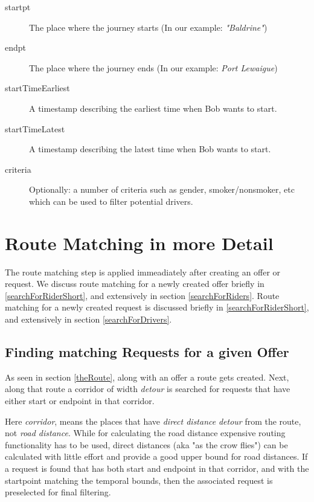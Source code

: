 \begin{description}


\item[startpt]{The place where the journey starts (In our example: \emph{"Baldrine"})}
\item[endpt]{The place where the journey ends (In our example: \emph{Port Lewaigue})}

\item[startTimeEarliest]{A timestamp describing the earliest time when Bob wants to start.}
\item[startTimeLatest]{A timestamp describing the latest time when Bob wants to start.}
\item[criteria]{Optionally: a number of criteria such as gender, smoker/nonsmoker, etc 
      which can be used to filter potential drivers.  	
     }
\end{description}

\section{Route Matching in more Detail}
The route matching step is applied immeadiately after creating an offer or request.
We discuss route matching for a newly created offer briefly in  \ref{searchForRiderShort},
and extensively in section \ref{searchForRiders}.
Route matching for a newly created request is discussed briefly in  \ref{searchForRiderShort},
and extensively in section \ref{searchForDrivers}.


\subsection{Finding matching Requests for a given Offer}
\label{searchForRiderShort}

As seen in section \ref{theRoute}, along with an offer a route gets created.
Next, along that route a corridor of width \emph{detour} is searched for requests that 
have either start or endpoint in that corridor.

Here \emph{corridor}, means the places that have \emph{direct distance} \emph{detour} from the route, 
not \emph{road distance}. While for calculating the road distance expensive routing functionality has 
to be used, direct distances (aka "as the crow flies") can be calculated with little effort and 
provide a good upper bound for road distances. 
If a request is found that has both start and endpoint in that corridor, and with
the startpoint matching the temporal bounds, then the associated request is
preselected for final filtering.

